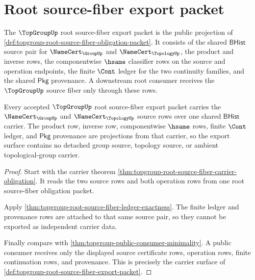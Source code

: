 \section{Root source-fiber export packet}
\label{sec:topgroup-root-source-fiber-export-packet}

\begin{definition}
\label{def:topgroup-root-source-fiber-export-packet}
The $\TopGroupUp$ root source-fiber export packet is the public projection of
\autoref{def:topgroup-root-source-fiber-obligation-packet}. It consists of the
shared $\mathsf{BHist}$ source pair for
$\NameCert_{\GroupUp}$ and $\NameCert_{\TopologyUp}$, the product and inverse
rows, the componentwise $\hsame$ classifier rows on the source and operation
endpoints, the finite $\Cont$ ledger for the two continuity families, and the
shared $\mathsf{Pkg}$ provenance. A downstream root consumer receives the
$\TopGroupUp$ source fiber only through these rows.
\end{definition}

\begin{theorem}
\label{thm:topgroup-root-source-fiber-export-carrier}
Every accepted $\TopGroupUp$ root source-fiber export packet carries the
$\NameCert_{\GroupUp}$ and $\NameCert_{\TopologyUp}$ source rows over one
shared $\mathsf{BHist}$ carrier. The product row, inverse row, componentwise
$\hsame$ rows, finite $\Cont$ ledger, and $\mathsf{Pkg}$ provenance are
projections from that carrier, so the export surface contains no detached
group source, topology source, or ambient topological-group carrier.
\end{theorem}
\begin{proof}
Start with the carrier theorem
\autoref{thm:topgroup-root-source-fiber-carrier-obligation}. It reads the two
source rows and both operation rows from one root source-fiber obligation
packet.

Apply \autoref{thm:topgroup-root-source-fiber-ledger-exactness}. The finite
ledger and provenance rows are attached to that same source pair, so they
cannot be exported as independent carrier data.

Finally compare with
\autoref{thm:topgroup-public-consumer-minimality}. A public consumer receives
only the displayed source certificate rows, operation rows, finite
continuation rows, and provenance. This is precisely the carrier surface of
\autoref{def:topgroup-root-source-fiber-export-packet}.
\end{proof}

